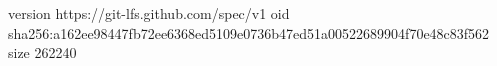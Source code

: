 version https://git-lfs.github.com/spec/v1
oid sha256:a162ee98447fb72ee6368ed5109e0736b47ed51a00522689904f70e48c83f562
size 262240
